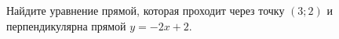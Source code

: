 \begin{ex}
	\begin{condition}
		Найдите уравнение прямой, которая проходит через точку \( (3;2) \) и перпендикулярна прямой \( y=-2x+2 \).
	\end{condition}
\end{ex}